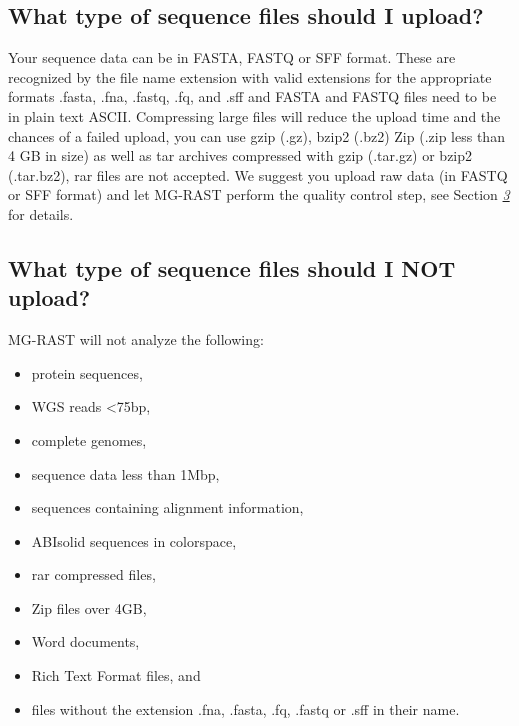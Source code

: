 \documentclass[letterpaper,10pt,english]{sphinxmanual}
\begin{document}
\subsection{What type of sequence files should I upload?}
\label{\detokenize{user_manual:what-type-of-sequence-files-should-i-upload}}
Your sequence data can be in FASTA, FASTQ or SFF format. These are
recognized by the file name extension with valid extensions for the
appropriate formats .fasta, .fna, .fastq, .fq, and .sff and FASTA and
FASTQ files need to be in plain text ASCII. Compressing large files will
reduce the upload time and the chances of a failed upload, you can use
gzip (.gz), bzip2 (.bz2) Zip (.zip less than 4 GB in size) as well as
tar archives compressed with gzip (.tar.gz) or bzip2 (.tar.bz2), rar
files are not accepted. We suggest you upload raw data (in FASTQ or SFF
format) and let MG-RAST perform the quality control step, see Section
{\hyperref[\detokenize{user_manual:section:mgrast_pipeline_details}]{\emph{3}}} for details.


\subsection{What type of sequence files should I NOT upload?}
\label{\detokenize{user_manual:what-type-of-sequence-files-should-i-not-upload}}
MG-RAST will not analyze the following:
\begin{itemize}
\item {} 
protein sequences,

\item {} 
WGS reads \textless{}75bp,

\item {} 
complete genomes,

\item {} 
sequence data less than 1Mbp,

\item {} 
sequences containing alignment information,

\item {} 
ABIsolid sequences in colorspace,

\item {} 
rar compressed files,

\item {} 
Zip files over 4GB,

\item {} 
Word documents,

\item {} 
Rich Text Format files, and

\item {} 
files without the extension .fna, .fasta, .fq, .fastq or .sff in
their name.

\end{itemize}
\end{document}
